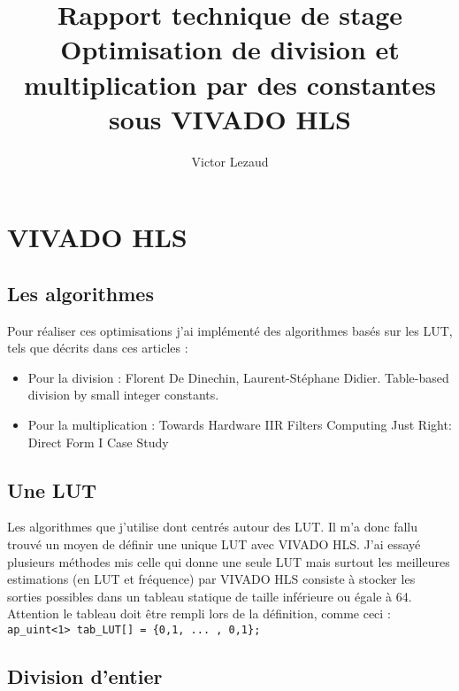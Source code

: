 \documentclass[10pt,a4paper,twoside]{article}
\author{Victor Lezaud}
\title{Rapport technique de stage\\ Optimisation de division et multiplication par des constantes sous VIVADO HLS}
\begin{document}
\maketitle
\renewcommand{\contentsname}{Sommaire}
\tableofcontents
\newpage

\section{VIVADO HLS}
\subsection{Les algorithmes}
Pour réaliser ces optimisations j'ai implémenté des algorithmes basés sur les LUT, tels que décrits dans ces articles :
\begin{itemize}
    \item Pour la division : Florent De Dinechin, Laurent-Stéphane Didier. Table-based division by small integer constants.
    \item Pour la multiplication : Towards Hardware IIR Filters Computing Just Right: Direct Form I Case Study
\end{itemize}

\subsection{Une LUT}
Les algorithmes que j'utilise dont centrés autour des LUT. Il m'a donc fallu trouvé un moyen de définir une unique LUT avec 
VIVADO HLS. J'ai essayé plusieurs méthodes mis celle qui donne une seule LUT mais surtout les meilleures estimations (en LUT et fréquence)
par VIVADO HLS consiste à stocker les sorties  possibles dans un tableau statique de taille inférieure ou égale à 64. Attention le 
tableau doit être rempli lors de la définition, comme ceci : \verb|ap_uint<1> tab_LUT[] = {0,1, ... , 0,1};|

\subsection{Division d'entier}
\end{document}
